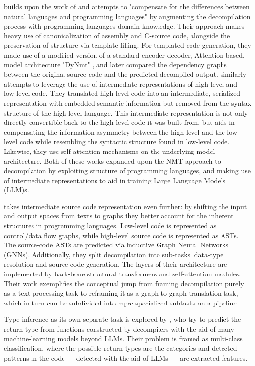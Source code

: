\documentclass[../main.tex]{subfiles}
\begin{document}
\cite{katz_towards_2019} builds upon the work of \cite{katz_using_2018} and attempts 
to "compensate for the differences between natural languages and programming 
languages" by augmenting the decompilation process with programming-languages 
domain-knowledge. Their approach makes heavy use of canonicalization of assembly 
and C-source code, alongside the preservation of structure via template-filling. 
For templated-code generation, they made use of a modified version of a standard 
encoder-decoder, Attention-based, model architecture "DyNmt" \cite{dynmt}, and 
later compared the dependency graphs between the original source code and the 
predicted decompiled output.
\cite{liang_semantics-recovering_2021} similarly attempts to leverage the use of
intermediate representations of high-level and low-level code. They translated 
high-level code into an intermediate, serialized representation with embedded 
semantic information but removed from the syntax structure of the high-level 
language. This intermediate representation is not only directly convertible back
to the high-level code it was built from, but aids in compensating the information
asymmetry between the high-level and the low-level code while resembling the 
syntactic structure found in low-level code. Likewise, they use self-attention 
mechanisms on the underlying model architecture.
Both of these works expanded upon the NMT approach to decompilation by exploiting
structure of programming languages, and making use of intermediate representations
to aid in training Large Language Models (LLM)s.

\cite{fu_n-bref_2020} takes intermediate source code representation even further: 
by shifting the input and output spaces from texts to graphs they better account 
for the inherent structures in programming languages. Low-level code is represented 
as control/data flow graphs, while high-level source code is represented as ASTs.
The source-code ASTs are predicted via inductive Graph Neural Networks (GNNs).
Additionally, they split decompilation into sub-tasks: data-type resolution and 
source-code generation. The layers of their architecture are implemented by back-bone
structural transformers and self-attention modules.
Their work exemplifies the conceptual jump from framing decompilation purely as a
text-processing task to reframing it as a graph-to-graph translation task, which
in turn can be subdivided into mpre specialized subtasks on a pipeline.

Type inference as its own separate task is explored by \cite{escalada_improving_2021},
who try to predict the return type from functions constructed by decompilers with
the aid of many machine-learning models beyond LLMs. Their problem is framed as
multi-class classification, where the possible return types are the categories and
detected patterns in the code — detected with the aid of LLMs — are extracted features.
\end{document}
